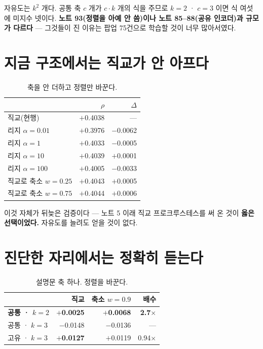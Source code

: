 \documentclass[10pt]{article}
\begin{document}
자유도는 $k^2$ 개다. 공통 축 $c$ 개가 $c\!\cdot\!k$ 개의 식을 주므로 $k{=}2$ ·
$c{=}3$ 이면 식 여섯에 미지수 넷이다. \textbf{노트 93(정렬을 아예 안 씀)이나
노트 85--88(공유 인코더)과 규모가 다르다} --- 그것들이 진 이유는 팝업 75건으로
학습할 것이 너무 많아서였다.

\section{지금 구조에서는 직교가 안 아프다}

\begin{table}[t]
\centering\tsize
\caption{축을 안 더하고 정렬만 바꾼다.}
\begin{tabular}{lrr}
\toprule
& $\rho$ & $\Delta$ \\
\midrule
직교(현행) & $+$0.4038 & --- \\
리지 $\alpha{=}0.01$ & $+$0.3976 & $-$0.0062 \\
리지 $\alpha{=}1$ & $+$0.4033 & $-$0.0005 \\
리지 $\alpha{=}10$ & $+$0.4039 & $+$0.0001 \\
리지 $\alpha{=}100$ & $+$0.4005 & $-$0.0033 \\
직교로 축소 $w{=}0.25$ & $+$0.4043 & $+$0.0005 \\
직교로 축소 $w{=}0.75$ & $+$0.4044 & $+$0.0006 \\
\bottomrule
\end{tabular}
\end{table}


이것 자체가 뒤늦은 검증이다 --- 노트 5 이래 직교 프로크루스테스를 써 온 것이
\textbf{옳은 선택이었다.} 자유도를 늘려도 얻을 것이 없다.

\section{진단한 자리에서는 정확히 듣는다}

\begin{table}[t]
\centering\tsize
\caption{설명문 축 하나. 정렬을 바꾼다.}
\begin{tabular}{lrrr}
\toprule
& 직교 & 축소 $w{=}0.9$ & 배수 \\
\midrule
\textbf{공통 · $k{=}2$} & \textbf{$+$0.0025} & \textbf{$+$0.0068} &
\textbf{2.7$\times$} \\
공통 · $k{=}3$ & $-$0.0148 & $-$0.0136 & --- \\
고유 · $k{=}3$ & \textbf{$+$0.0127} & $+$0.0119 & 0.94$\times$ \\
\bottomrule
\end{tabular}
\end{table}
\end{document}
